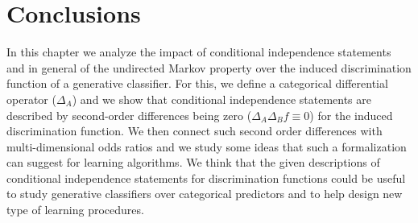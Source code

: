 \documentclass[11pt,a4paper, twoside]{book}
\begin{document}
\section{Conclusions}
\label{sec:conclusion3}

In this chapter we analyze the impact of conditional independence statements and in general of the undirected Markov property over the induced discrimination function of a generative classifier. For this, we define a categorical {differential} operator ($\Delta_A$) and we show that conditional independence statements are described by second-order differences being zero ($\Delta_A\Delta_Bf \equiv 0$) for the induced discrimination function.
We then connect such second order differences with multi-dimensional odds ratios and we study some ideas that such a formalization can suggest for learning algorithms.
We think that the given descriptions of conditional independence statements for discrimination functions could be useful to study generative classifiers over categorical predictors and to help design new type of learning procedures.

\end{document}
